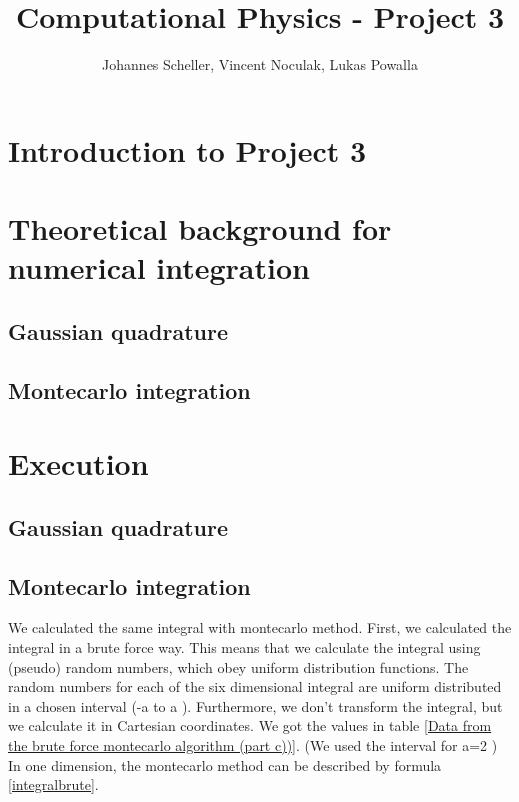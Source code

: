 \documentclass[10pt,a4paper]{article}
\author{Johannes Scheller, Vincent Noculak, Lukas Powalla}
\title{Computational Physics - Project 3}
\begin{document}
\maketitle
\newpage
\tableofcontents
\newpage
\section{Introduction to Project 3}

\section{Theoretical background for numerical integration}

\subsection{Gaussian quadrature}

\subsection{Montecarlo integration}

\section{Execution}

\subsection{Gaussian quadrature}

\subsection{Montecarlo integration}

We calculated the same integral with montecarlo method. First, we calculated the integral in a brute force way. This means that we calculate the integral using (pseudo) random numbers, which obey uniform distribution functions. The random numbers for each of the six dimensional integral are uniform distributed in a chosen interval (-a to a ). Furthermore, we don't transform the integral, but we calculate it in Cartesian coordinates. We got the values in table \ref{Data from the brute force montecarlo algorithm (part c))}. (We used the interval for a=2 ) In one dimension, the montecarlo method can be described by formula \ref{integralbrute}. 
\end{document}
